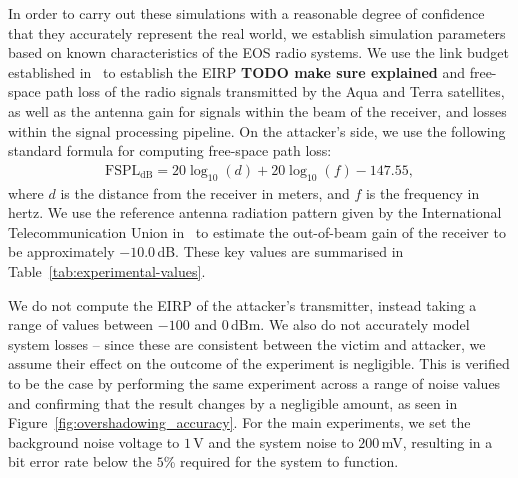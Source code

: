 In order to carry out these simulations with a reasonable degree of confidence that they accurately represent the real world, we establish simulation parameters based on known characteristics of the EOS radio systems.
We use the link budget established in~\cite{quinnNew2003} to establish the EIRP \textbf{TODO make sure explained} and free-space path loss of the radio signals transmitted by the Aqua and Terra satellites, as well as the antenna gain for signals within the beam of the receiver, and losses within the signal processing pipeline.
On the attacker's side, we use the following standard formula for computing free-space path loss:
\begin{align}
    \text{FSPL}_{\text{dB}} = 20\log_{10}(d) + 20\log_{10}(f) - 147.55, \label{eq:fspl}
\end{align}
where $d$ is the distance from the receiver in meters, and $f$ is the frequency in hertz.
We use the reference antenna radiation pattern given by the International Telecommunication Union in~\cite{itu2022antenna} to estimate the out-of-beam gain of the receiver to be approximately $-10.0$\,dB.
These key values are summarised in Table~\ref{tab:experimental-values}.

\begin{table}
    \resizebox{\columnwidth}{!}{%
    \begin{tabular}{lcc}
        \toprule
        & Victim & Attacker \\
        \midrule
        EIRP (dBm) & $44.4$ & $[-100,0)$ \\
        Distance $d$ (km) & $\sim 713$ & $[0, 10)$ \\
        Free-Space Path Loss (dB) & $179.0$ & $\text{FSPL}_{\text{dB}}(d)$ \\
        Amplitude Multiplier $\left(m = 10^{\frac{\text{EIRP}_{\text{dB}}-\text{FSPL}_{\text{dB}}}{20}}\right)$ & $1.86 \cdot 10^{-7}$ & $m$  \\
        Antenna Gain $g_A$ (dB) & $44.1$ & $-10.0$ \\
        Antenna Amplitude Multiplier $\left( m_A = 10^{\frac{g_A}{20}} \right)$ & $160$ & $0.316$ \\
        System Losses (dB) & $3.7$ & $3.7$ \\
        \bottomrule
    \end{tabular}%
    }
    \caption{Key values used in overshadowing simulations.}
    \label{tab:experimental-values}
\end{table}

We do not compute the EIRP of the attacker's transmitter, instead taking a range of values between $-100$ and $0$\,dBm.
We also do not accurately model system losses -- since these are consistent between the victim and attacker, we assume their effect on the outcome of the experiment is negligible.
This is verified to be the case by performing the same experiment across a range of noise values and confirming that the result changes by a negligible amount, as seen in Figure~\ref{fig:overshadowing_accuracy}.
For the main experiments, we set the background noise voltage to $1\,$\textmu V and the system noise to $200$\,mV, resulting in a bit error rate below the $5$\% required for the system to function.

